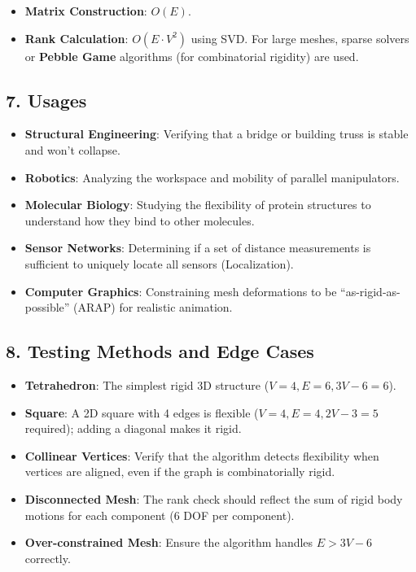 \begin{itemize}
    \item \textbf{Matrix Construction}: $O(E)$.
    \item \textbf{Rank Calculation}: $O(E \cdot V^2)$ using SVD. For large meshes, sparse solvers or \textbf{Pebble Game} algorithms (for combinatorial rigidity) are used.
\end{itemize}

\subsection{7. Usages}

\begin{itemize}
    \item \textbf{Structural Engineering}: Verifying that a bridge or building truss is stable and won't collapse.
    \item \textbf{Robotics}: Analyzing the workspace and mobility of parallel manipulators.
    \item \textbf{Molecular Biology}: Studying the flexibility of protein structures to understand how they bind to other molecules.
    \item \textbf{Sensor Networks}: Determining if a set of distance measurements is sufficient to uniquely locate all sensors (Localization).
    \item \textbf{Computer Graphics}: Constraining mesh deformations to be ``as-rigid-as-possible'' (ARAP) for realistic animation.
\end{itemize}

\subsection{8. Testing Methods and Edge Cases}

\begin{itemize}
    \item \textbf{Tetrahedron}: The simplest rigid 3D structure ($V=4, E=6, 3V-6=6$).
    \item \textbf{Square}: A 2D square with 4 edges is flexible ($V=4, E=4, 2V-3=5$ required); adding a diagonal makes it rigid.
    \item \textbf{Collinear Vertices}: Verify that the algorithm detects flexibility when vertices are aligned, even if the graph is combinatorially rigid.
    \item \textbf{Disconnected Mesh}: The rank check should reflect the sum of rigid body motions for each component (6 DOF per component).
    \item \textbf{Over-constrained Mesh}: Ensure the algorithm handles $E > 3V-6$ correctly.
\end{itemize}

